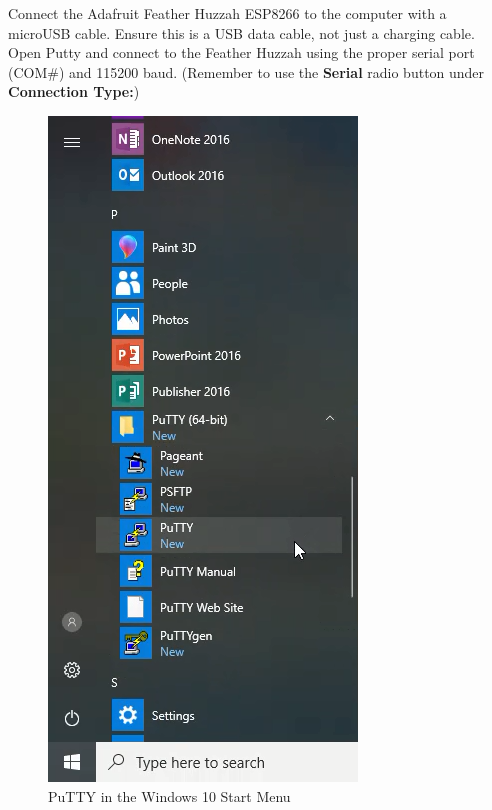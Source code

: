 \documentclass{book}
\makeatletter
\def\maxwidth{\ifdim\Gin@nat@width>\linewidth\linewidth
    \else\Gin@nat@width\fi}
\let\Oldincludegraphics\includegraphics
\renewcommand{\includegraphics}[1]{\Oldincludegraphics[width=.8\maxwidth]{#1}}
\makeatother
\begin{document}
    Connect the Adafruit Feather Huzzah ESP8266 to the computer with a
microUSB cable. Ensure this is a USB data cable, not just a charging
cable. Open Putty and connect to the Feather Huzzah using the proper
serial port (COM\#) and 115200 baud. (Remember to use the
\textbf{Serial} radio button under \textbf{Connection Type:})

\begin{figure}
\centering
\includegraphics{images/putty_in_start_menu.png}
\caption{PuTTY in the Windows 10 Start Menu}
\end{figure}
\end{document}
